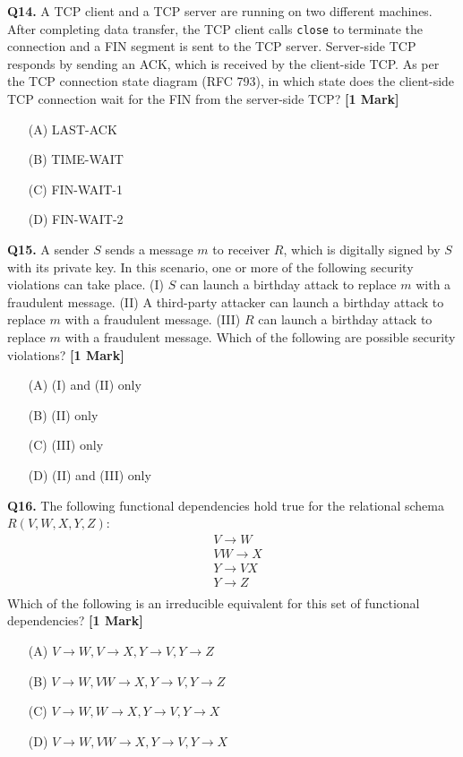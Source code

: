 \documentclass[11pt]{article}
\newcommand{\questiona}[2]{
    \noindent\textbf{Q#2.} #1 \hfill \textbf{[1 Mark]}
}
\begin{document}
\questiona{A TCP client and a TCP server are running on two different machines. After completing data transfer, the TCP client calls \texttt{close} to terminate the connection and a FIN segment is sent to the TCP server. Server-side TCP responds by sending an ACK, which is received by the client-side TCP. As per the TCP connection state diagram (RFC 793), in which state does the client-side TCP connection wait for the FIN from the server-side TCP?}{14}
\begin{enumerate}
    \item[(A)] LAST-ACK  
    \item[(B)] TIME-WAIT  
    \item[(C)] FIN-WAIT-1  
    \item[(D)] FIN-WAIT-2  
\end{enumerate}
\vspace{0.5cm}

\questiona{A sender \( S \) sends a message \( m \) to receiver \( R \), which is digitally signed by \( S \) with its private key. In this scenario, one or more of the following security violations can take place.  
(I) \( S \) can launch a birthday attack to replace \( m \) with a fraudulent message.  
(II) A third-party attacker can launch a birthday attack to replace \( m \) with a fraudulent message.  
(III) \( R \) can launch a birthday attack to replace \( m \) with a fraudulent message.  
Which of the following are possible security violations?}{15}
\begin{enumerate}
    \item[(A)] (I) and (II) only  
    \item[(B)] (II) only  
    \item[(C)] (III) only  
    \item[(D)] (II) and (III) only  
\end{enumerate}
\vspace{0.5cm}

\questiona{The following functional dependencies hold true for the relational schema \( R(V, W, X, Y, Z) \):  
\[
\begin{aligned}
& V \rightarrow W \\
& VW \rightarrow X \\
& Y \rightarrow VX \\
& Y \rightarrow Z \\
\end{aligned}
\]
Which of the following is an irreducible equivalent for this set of functional dependencies?}{16}
\begin{enumerate}
    \item[(A)] \( V \rightarrow W, V \rightarrow X, Y \rightarrow V, Y \rightarrow Z \)  
    \item[(B)] \( V \rightarrow W, VW \rightarrow X, Y \rightarrow V, Y \rightarrow Z \)  
    \item[(C)] \( V \rightarrow W, W \rightarrow X, Y \rightarrow V, Y \rightarrow X \)  
    \item[(D)] \( V \rightarrow W, VW \rightarrow X, Y \rightarrow V, Y \rightarrow X \)  
\end{enumerate}
\vspace{0.5cm}
\end{document}
